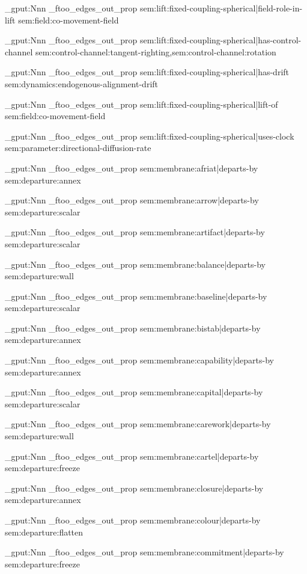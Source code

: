 \prop_gput:Nnn \g_ftoo_edges_out_prop { sem:lift:fixed-coupling-spherical|field-role-in-lift } { sem:field:co-movement-field }

\prop_gput:Nnn \g_ftoo_edges_out_prop { sem:lift:fixed-coupling-spherical|has-control-channel } { sem:control-channel:tangent-righting,sem:control-channel:rotation }

\prop_gput:Nnn \g_ftoo_edges_out_prop { sem:lift:fixed-coupling-spherical|has-drift } { sem:dynamics:endogenous-alignment-drift }

\prop_gput:Nnn \g_ftoo_edges_out_prop { sem:lift:fixed-coupling-spherical|lift-of } { sem:field:co-movement-field }

\prop_gput:Nnn \g_ftoo_edges_out_prop { sem:lift:fixed-coupling-spherical|uses-clock } { sem:parameter:directional-diffusion-rate }

\prop_gput:Nnn \g_ftoo_edges_out_prop { sem:membrane:afriat|departs-by } { sem:departure:annex }

\prop_gput:Nnn \g_ftoo_edges_out_prop { sem:membrane:arrow|departs-by } { sem:departure:scalar }

\prop_gput:Nnn \g_ftoo_edges_out_prop { sem:membrane:artifact|departs-by } { sem:departure:scalar }

\prop_gput:Nnn \g_ftoo_edges_out_prop { sem:membrane:balance|departs-by } { sem:departure:wall }

\prop_gput:Nnn \g_ftoo_edges_out_prop { sem:membrane:baseline|departs-by } { sem:departure:scalar }

\prop_gput:Nnn \g_ftoo_edges_out_prop { sem:membrane:bistab|departs-by } { sem:departure:annex }

\prop_gput:Nnn \g_ftoo_edges_out_prop { sem:membrane:capability|departs-by } { sem:departure:annex }

\prop_gput:Nnn \g_ftoo_edges_out_prop { sem:membrane:capital|departs-by } { sem:departure:scalar }

\prop_gput:Nnn \g_ftoo_edges_out_prop { sem:membrane:carework|departs-by } { sem:departure:wall }

\prop_gput:Nnn \g_ftoo_edges_out_prop { sem:membrane:cartel|departs-by } { sem:departure:freeze }

\prop_gput:Nnn \g_ftoo_edges_out_prop { sem:membrane:closure|departs-by } { sem:departure:annex }

\prop_gput:Nnn \g_ftoo_edges_out_prop { sem:membrane:colour|departs-by } { sem:departure:flatten }

\prop_gput:Nnn \g_ftoo_edges_out_prop { sem:membrane:commitment|departs-by } { sem:departure:freeze }

